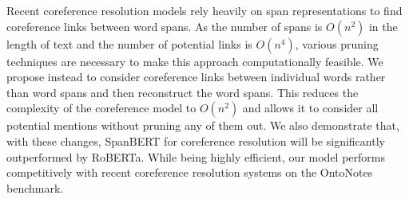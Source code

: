 Recent coreference resolution models rely heavily on span representations to find coreference links between word spans. As the number of spans is $O(n^2)$ in the length of text and the number of potential links is $O(n^4)$, various pruning techniques are necessary to make this approach computationally feasible. We propose instead to consider coreference links between individual words rather than word spans and then reconstruct the word spans. This reduces the complexity of the coreference model to $O(n^2)$ and allows it to consider all potential mentions without pruning any of them out. We also demonstrate that, with these changes, SpanBERT for coreference resolution will be significantly outperformed by RoBERTa. While being highly efficient, our model performs competitively with recent coreference resolution systems on the OntoNotes benchmark.

